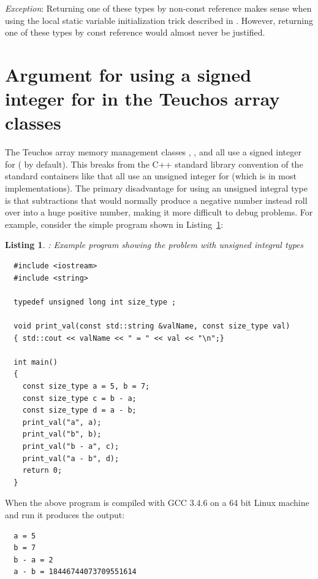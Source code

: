 \documentclass[pdf,ps2pdf,11pt]{SANDreport}
\newtheorem{listing}{Listing}
\begin{document}
{}\textit{Exception}: Returning one of these types by non-const
reference makes sense when using the local static variable
initialization trick described in {}\cite[Item
4]{EffectiveC++ThirdEdition}.  However, returning one of these types
by const reference would almost never be justified.


%
{}\section{Argument for using a signed integer for
{} in the Teuchos array classes}
\label{sec:unsigned_size_type}
%

The Teuchos array memory management classes {},
{}, and {} all use a signed integer for
{} ({} by default).  This breaks from
the C++ standard library convention of the standard containers like
{} that all use an unsigned integer for
{} (which is {} in most implementations).
The primary disadvantage for using an unsigned integral type is that
subtractions that would normally produce a negative number instead
roll over into a huge positive number, making it more difficult to
debug problems.  For example, consider the simple program shown in
Listing~\ref{listing:unsigned-int-problem}:


{}\begin{listing}: Example program showing the problem with unsigned
integral types
\label{listing:unsigned-int-problem}
{\small\begin{verbatim}
  #include <iostream>
  #include <string>
  
  typedef unsigned long int size_type ;
  
  void print_val(const std::string &valName, const size_type val)
  { std::cout << valName << " = " << val << "\n";}
  
  int main()
  {
    const size_type a = 5, b = 7;
    const size_type c = b - a;
    const size_type d = a - b;
    print_val("a", a);
    print_val("b", b);
    print_val("b - a", c);
    print_val("a - b", d);
    return 0;
  }
\end{verbatim}}
\end{listing}


When the above program is compiled with GCC 3.4.6 on a 64 bit Linux
machine and run it produces the output:


{\small\begin{verbatim}
  a = 5
  b = 7
  b - a = 2
  a - b = 18446744073709551614
\end{verbatim}}
\end{document}
